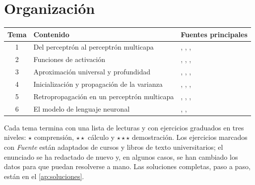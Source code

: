 \documentclass[11pt,a4paper,twoside,openany]{book}
\begin{document}
\section*{Organización}
\begin{center}\small
\begin{tabular}{@{}cll@{}}
\toprule
Tema & Contenido & Fuentes principales \\
\midrule
1 & Del perceptrón al perceptrón multicapa & \cite{gbc}, \cite{jm3}, \cite{cs4780}, \cite{cs231n} \\
2 & Funciones de activación & \cite{gbc}, \cite{d2l}, \cite{hendrycks}, \cite{shazeer} \\
3 & Aproximación universal y profundidad & \cite{gbc}, \cite{cybenko}, \cite{leshno}, \cite{telgarsky} \\
4 & Inicialización y propagación de la varianza & \cite{gbc}, \cite{glorot}, \cite{he}, \cite{cs231n} \\
5 & Retropropagación en un perceptrón multicapa & \cite{gbc}, \cite{bishopdl}, \cite{cs231n}, \cite{cs224n} \\
6 & El modelo de lenguaje neuronal & \cite{bengio}, \cite{jm3}, \cite{d2l} \\
\bottomrule
\end{tabular}
\end{center}

Cada tema termina con una lista de lecturas y con ejercicios graduados en tres niveles: $\star$ comprensión, $\star\star$ cálculo y $\star\star\star$ demostración. Los ejercicios marcados con \emph{Fuente} están adaptados de cursos y libros de texto universitarios; el enunciado se ha redactado de nuevo y, en algunos casos, se han cambiado los datos para que puedan resolverse a mano. Las soluciones completas, paso a paso, están en el \cref{ap:soluciones}.
\end{document}
